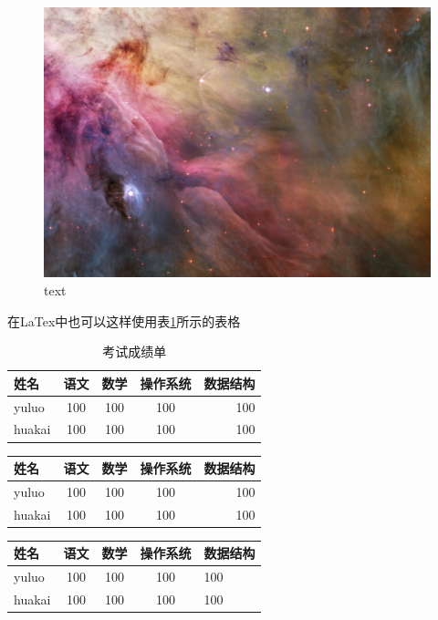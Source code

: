 \documentclass{ctexart}
\begin{document}
	\begin{figure}[htbp]
		\centering
		\includegraphics[scale=0.3]{1.jpg}
		\caption{text}
	\end{figure}

	在LaTex中也可以这样使用表\ref{tab-score}所示的表格
	\begin{table}
		\centering
		\caption{考试成绩单}\label{tab-score}
		\begin{tabular}{|l|c|c|c|r|}
			\hline
			姓名 & 语文 & 数学 & 操作系统 & 数据结构 \\
			\hline
			yuluo & 100 & 100 & 100 & 100 \\
			\hline
			huakai & 100 & 100 & 100 & 100 \\
			\hline
		\end{tabular}
	\end{table}

	\begin{tabular}{|l|c|c|c|r|}
	\hline
		姓名 & 语文 & 数学 & 操作系统 & 数据结构 \\
	\hline
		yuluo & 100 & 100 & 100 & 100 \\
	\hline
		huakai & 100 & 100 & 100 & 100 \\
	\hline
	\end{tabular}

	\begin{tabular}{|l|c|c|c|p{1.5cm}|}
	\hline
		姓名 & 语文 & 数学 & 操作系统 & 数据结构 \\
	\hline
		yuluo & 100 & 100 & 100 & 100 \\
	\hline
		huakai & 100 & 100 & 100 & 100 \\
	\hline
	\end{tabular}
\end{document}
